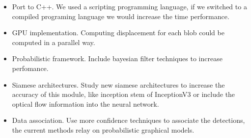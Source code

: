 \begin{itemize}

\item Port to C++. We used a scripting programming language, if we switched to a compiled programing language we would increase the time performance.

\item GPU implementation. Computing displacement for each blob could be computed in a parallel way. 

\item Probabilistic framework. Include bayesian filter techniques to increase perfomance.

\item Siamese architectures. Study new siamese architectures to increase the accuracy of this module, like inception stem of InceptionV3 or include the optical flow information into the neural network.

\item Data association. Use more confidence techniques to associate the detections, the current methods relay on probabilistic graphical models.

\end{itemize}


